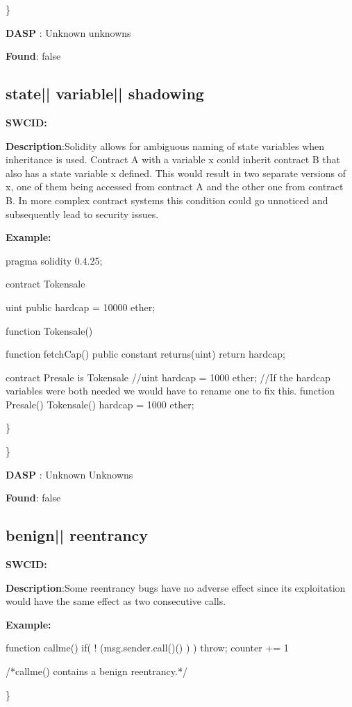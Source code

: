 \documentclass{article}
\begin{document}
\} 

\textbf{DASP} : Unknown unknowns

\textbf{Found}: false

\subsection{state{|\textunderscore| }variable{|\textunderscore| }shadowing} 
\textbf{SWC{\textunderscore }ID:} 

\textbf{Description}:Solidity allows for ambiguous naming of state variables when inheritance is used. Contract A with a variable x could inherit contract B that also has a state variable x defined. This would result in two separate versions of x, one of them being accessed from contract A and the other one from contract B. In more complex contract systems this condition could go unnoticed and subsequently lead to security issues.


\textbf{Example:} 
\begin{ffcode} 

pragma solidity 0.4.25;

contract Tokensale {
    uint public hardcap = 10000 ether;

    function Tokensale() {}

    function fetchCap() public constant returns(uint) {
        return hardcap;
    }
}

contract Presale is Tokensale {
    //uint hardcap = 1000 ether;
    //If the hardcap variables were both needed we would have to rename one to fix this.
    function Presale() Tokensale() {
        hardcap = 1000 ether;
    }
}

\end{ffcode} 
\} 

\} 

\textbf{DASP} : Unknown Unknowns

\textbf{Found}: false

\subsection{benign{|\textunderscore| }reentrancy} 
\textbf{SWC{\textunderscore }ID:} 

\textbf{Description}:Some re{\textendash}entrancy bugs have no adverse effect since its exploitation would have the same effect as two consecutive calls.


\textbf{Example:} 
\begin{ffcode} 

function callme(){
  if( ! (msg.sender.call()() ) ){
    throw;
  }
  counter += 1
}

 /*callme() contains a benign reentrancy.*/ 

\end{ffcode} 
\} 
\end{document}
